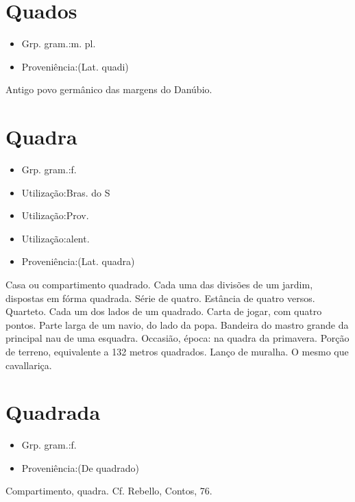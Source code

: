 \section{Quados}
\begin{itemize}
\item {Grp. gram.:m. pl.}
\end{itemize}
\begin{itemize}
\item {Proveniência:(Lat. \textunderscore quadi\textunderscore )}
\end{itemize}
Antigo povo germânico das margens do Danúbio.
\section{Quadra}
\begin{itemize}
\item {Grp. gram.:f.}
\end{itemize}
\begin{itemize}
\item {Utilização:Bras. do S}
\end{itemize}
\begin{itemize}
\item {Utilização:Prov.}
\end{itemize}
\begin{itemize}
\item {Utilização:alent.}
\end{itemize}
\begin{itemize}
\item {Proveniência:(Lat. \textunderscore quadra\textunderscore )}
\end{itemize}
Casa ou compartimento quadrado.
Cada uma das divisões de um jardim, dispostas em fórma quadrada.
Série de quatro.
Estância de quatro versos.
Quarteto.
Cada um dos lados de um quadrado.
Carta de jogar, com quatro pontos.
Parte larga de um navio, do lado da popa.
Bandeira do mastro grande da principal nau de uma esquadra.
Occasião, época: \textunderscore na quadra da primavera\textunderscore .
Porção de terreno, equivalente a 132 metros quadrados.
Lanço de muralha.
O mesmo que \textunderscore cavallariça\textunderscore .
\section{Quadrada}
\begin{itemize}
\item {Grp. gram.:f.}
\end{itemize}
\begin{itemize}
\item {Proveniência:(De \textunderscore quadrado\textunderscore )}
\end{itemize}
Compartimento, quadra. Cf. Rebello, \textunderscore Contos\textunderscore , 76.
